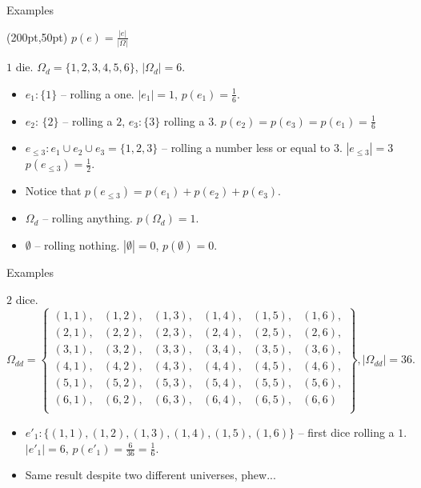 \documentclass{beamer}
\begin{document}
\begin{frame}{Examples}
  \begin{textblock*}{100pt}(200pt,50pt)
     $p(e) = \frac{|e|}{|\Omega|}$
  \end{textblock*}
  \begin{exampleblock}{$1$ die.}
    $\Omega_{d}= \{ 1, 2, 3, 4, 5, 6 \}$, $|\Omega_d| = 6$.
    \begin{itemize}
    \item $e_1: \{1\}$ -- rolling a one. $|e_1| = 1$, $p(e_1) = \frac{1}{6}$.
    \item $e_2$: $\{2\}$ -- rolling a $2$, $e_3: \{3\}$ rolling a $3$. $p(e_2) = p(e_3) = p(e_1) = \frac{1}{6}$ 
    \item $e_{\le 3}: e_1 \cup e_2 \cup e_3 = \{1,2,3\}$ -- rolling a number less or equal to $3$. $|e_{\le 3}| = 3$ $p(e_{\le 3}) = \frac{1}{2}$.
    \item Notice that $p(e_{\le 3}) = p(e_1) + p(e_2) + p(e_3)$.
    \item $\Omega_d$ -- rolling anything. $p(\Omega_d) = 1$.
    \item $\emptyset$ -- rolling nothing. $|\emptyset| = 0$, $p(\emptyset) = 0$.
    \end{itemize}
  \end{exampleblock}
\end{frame}

\begin{frame}{Examples}
  \begin{exampleblock}{$2$ dice.}
    \[ \Omega_{dd} = \left\{ \begin{array}{llllll}
      (1, 1), &(1, 2), &(1, 3), &(1, 4), &(1, 5), &(1, 6),\\
      (2, 1), &(2, 2), &(2, 3), &(2, 4), &(2, 5), &(2, 6),\\
      (3, 1), &(3, 2), &(3, 3), &(3, 4), &(3, 5), &(3, 6),\\
      (4, 1), &(4, 2), &(4, 3), &(4, 4), &(4, 5), &(4, 6),\\
      (5, 1), &(5, 2), &(5, 3), &(5, 4), &(5, 5), &(5, 6),\\
      (6, 1), &(6, 2), &(6, 3), &(6, 4), &(6, 5), &(6, 6)\\
      \end{array}
    \right \}, |\Omega_{dd}| = 36.\]
    \begin{itemize}
    \item $e'_1: \{ (1, 1), (1, 2), (1, 3), (1, 4), (1, 5), (1, 6)\}$ -- first dice rolling a $1$. $|e'_1| = 6$, $p(e'_1) = \frac{6}{36} = \frac{1}{6}$.
    \item Same result despite two different universes, phew...
    \end{itemize}
  \end{exampleblock}  
\end{frame}
\end{document}
